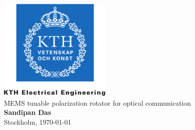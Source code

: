 \documentclass[../main.tex]{subfiles}
\begin{document}
	
    \begin{titlepage}
        \thispagestyle{empty}
        \begin{center}
            \includegraphics[height=5cm]{./Title/kth_cmyk_info_comm_tech}\\
            \vspace{2.5cm}
            \huge{MEMS tunable polarization rotator for optical communication}\\
            \vspace{4cm}
            \Large{\textbf{Sandipan Das}}\\
            \vspace{4cm}
            \Large{Stockholm, \today}
        \end{center} 
    \end{titlepage}
\end{document}
